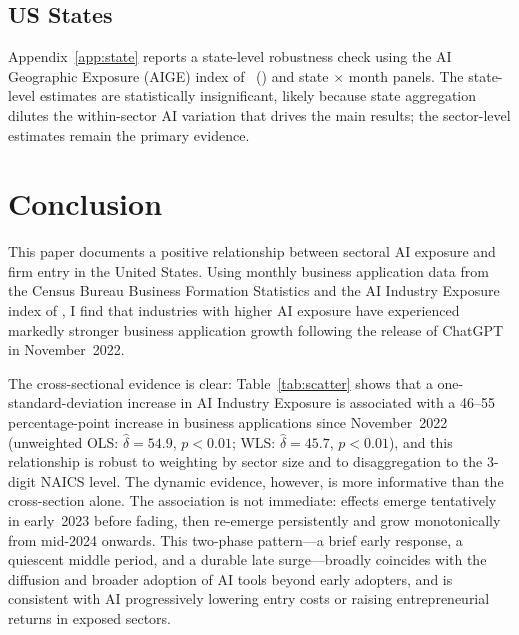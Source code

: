 \documentclass[12pt]{article}
\begin{document}
\subsection{US States}
\label{sec:states_robust}

Appendix~\ref{app:state} reports a state-level robustness check using the
AI Geographic Exposure (AIGE) index of
\citeauthor{felten2021occupational}~(\citeyear{felten2021occupational})
and state $\times$ month panels.
The state-level estimates are statistically insignificant, likely because
state aggregation dilutes the within-sector AI variation that drives the
main results; the sector-level estimates remain the primary evidence.

\section{Conclusion}
\label{sec:conclusion}

This paper documents a positive relationship between sectoral AI exposure and firm entry in the United States.
Using monthly business application data from the Census Bureau Business Formation Statistics and the AI Industry Exposure index of \citet{felten2021occupational}, I find that industries with higher AI exposure have experienced markedly stronger business application growth following the release of ChatGPT in November~2022.

The cross-sectional evidence is clear: Table~\ref{tab:scatter} shows that a one-standard-deviation increase in AI Industry Exposure is associated with a 46--55 percentage-point increase in business applications since November~2022 (unweighted OLS: $\hat{\delta}=54.9$, $p<0.01$; WLS: $\hat{\delta}=45.7$, $p<0.01$), and this relationship is robust to weighting by sector size and to disaggregation to the 3-digit NAICS level.
The dynamic evidence, however, is more informative than the cross-section alone.
The association is not immediate: effects emerge tentatively in early~2023 before fading, then re-emerge persistently and grow monotonically from mid-2024 onwards.
This two-phase pattern---a brief early response, a quiescent middle period, and a durable late surge---broadly coincides with the diffusion and broader adoption of AI tools beyond early adopters, and is consistent with AI progressively lowering entry costs or raising entrepreneurial returns in exposed sectors.
\end{document}
